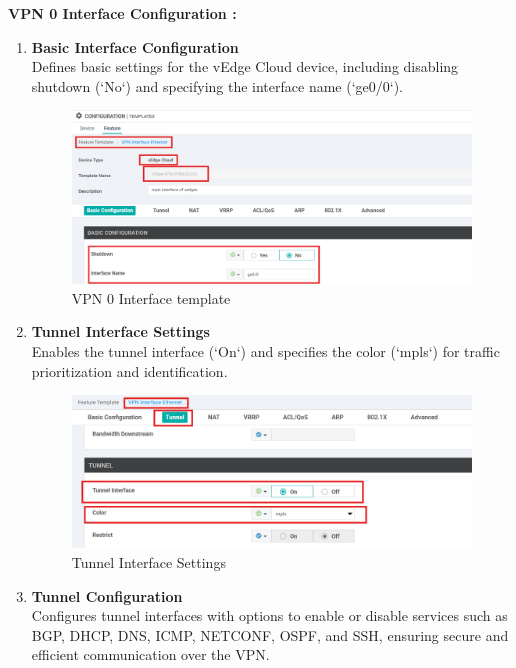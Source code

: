 \documentclass[12pt,english]{report}
\begin{document}
\textbf{VPN 0 Interface Configuration :}
\begin{enumerate}
    \item \textbf{Basic Interface Configuration} \\
    Defines basic settings for the vEdge Cloud device, including disabling shutdown (`No`) and specifying the interface name (`ge0/0`).
\begin{figure}[H]
    \centering
    \includegraphics[width= 1 \textwidth]{chapitre 3/template/5.png}
    \caption{VPN 0 Interface template}
    \label{VPN 0 Interface template}
\end{figure}
    \item \textbf{Tunnel Interface Settings} \\
    Enables the tunnel interface (`On`) and specifies the color (`mpls`) for traffic prioritization and identification.
\begin{figure}[H]
    \centering
    \includegraphics[width= 1 \textwidth]{chapitre 3/template/5.25.png}
    \caption{Tunnel Interface Settings}
    \label{Tunnel Interface Settings}
\end{figure}
    \item \textbf{Tunnel Configuration} \\
    Configures tunnel interfaces with options to enable or disable services such as BGP, DHCP, DNS, ICMP, NETCONF, OSPF, and SSH, ensuring secure and efficient communication over the VPN.
\begin{figure}[H]

\end{figure}
\end{enumerate}
\end{document}
